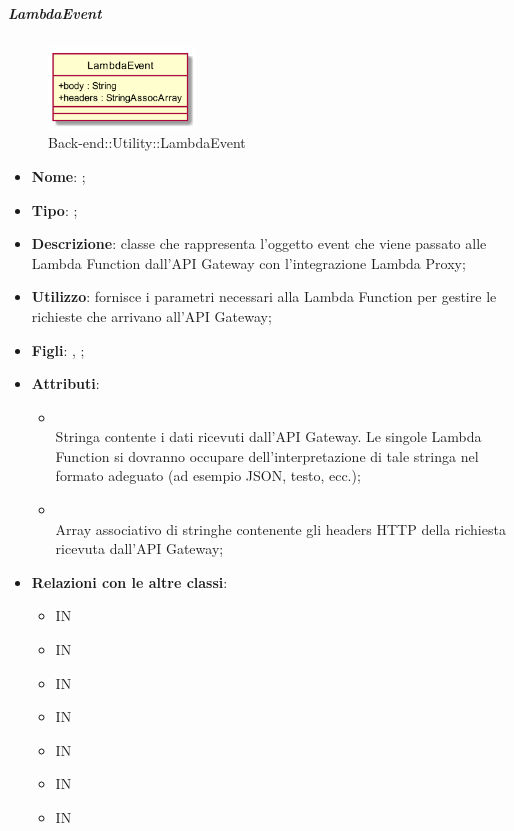 \hypertarget{LambdaEvent_label}{\subparagraph{LambdaEvent}}
\begin{figure}[h]
	\centering
	\includegraphics[width=0.35\textwidth,height=\textheight,keepaspectratio]{images/ClassLambdaEvent.png}
	\caption{Back-end::Utility::LambdaEvent}
\end{figure}
\begin{itemize}
	\item \textbf{Nome}: ;
	\item \textbf{Tipo}: ;
	\item \textbf{Descrizione}: classe che rappresenta l'oggetto event che viene passato alle Lambda Function dall'API Gateway con l'integrazione Lambda Proxy;
	\item \textbf{Utilizzo}: fornisce i parametri necessari alla Lambda Function per gestire le richieste che arrivano all'API Gateway;
	\item \textbf{Figli}: , ;
	\item \textbf{Attributi}:
	\begin{itemize}
		\item[]  \\
		Stringa contente i dati ricevuti dall'API Gateway. Le singole Lambda  Function si dovranno occupare dell'interpretazione di tale stringa nel formato adeguato (ad esempio JSON, testo, ecc.);
		\item[]  \\
		Array associativo di stringhe contenente gli headers HTTP della richiesta ricevuta dall'API Gateway;
	\end{itemize}
	\item \textbf{Relazioni con le altre classi}:
	\begin{itemize}
		\item IN \hyperlink{AdministrationWebhookService_label}{}
		\item IN \hyperlink{ConversationWebhookService_label}{}
		\item IN \hyperlink{NotificationService_label}{}
		\item IN \hyperlink{RulesService_label}{}
		\item IN \hyperlink{UsersService_label}{}
		\item IN \hyperlink{VAService_label}{}
		\item IN \hyperlink{VocalAPI_label}{}
	\end{itemize}
\end{itemize}
\FloatBarrier

